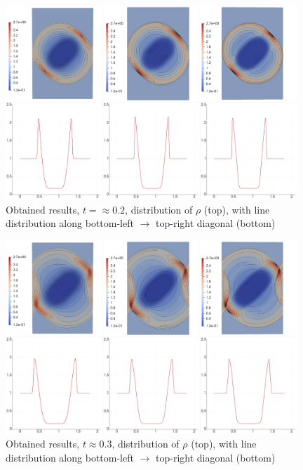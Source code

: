 \begin{figure}[H]
	\begin{center}
		\includegraphics[width=0.98\textwidth]{img/mhd-blast/new/blast,noadapt3.jpg}
\vspace{-3mm}
	\caption{Obtained results, $t = \approx 0.2$, distribution of $\rho$ (top), with line distribution along bottom-left $\rightarrow$ top-right diagonal (bottom)}
	\label{figure:blastNew02}
	\end{center}
\end{figure}
\vspace{-10mm}

\begin{figure}[H]
	\begin{center}
		\includegraphics[width=0.98\textwidth]{img/mhd-blast/new/blast,noadapt5.jpg}
\vspace{-3mm}
	\caption{Obtained results, $t \approx 0.3$, distribution of $\rho$ (top), with line distribution along bottom-left $\rightarrow$ top-right diagonal (bottom)}
	\label{figure:blastNew03}
	\end{center}
\end{figure}
\vspace{-10mm}

